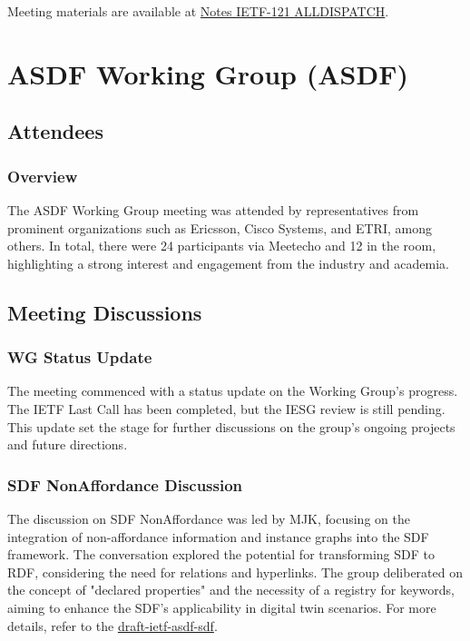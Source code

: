 \documentclass{article}
\begin{document}
Meeting materials are available at \href{https://notes.ietf.org/notes-ietf-121-alldispatch}{Notes IETF-121 ALLDISPATCH}.



\newpage

\section{ASDF Working Group (ASDF)}

\subsection{Attendees}
\subsubsection{Overview}
The ASDF Working Group meeting was attended by representatives from prominent organizations such as Ericsson, Cisco Systems, and ETRI, among others. In total, there were 24 participants via Meetecho and 12 in the room, highlighting a strong interest and engagement from the industry and academia.

\subsection{Meeting Discussions}

\subsubsection{WG Status Update}
The meeting commenced with a status update on the Working Group's progress. The IETF Last Call has been completed, but the IESG review is still pending. This update set the stage for further discussions on the group's ongoing projects and future directions.

\subsubsection{SDF NonAffordance Discussion}
The discussion on SDF NonAffordance was led by MJK, focusing on the integration of non-affordance information and instance graphs into the SDF framework. The conversation explored the potential for transforming SDF to RDF, considering the need for relations and hyperlinks. The group deliberated on the concept of "declared properties" and the necessity of a registry for keywords, aiming to enhance the SDF's applicability in digital twin scenarios. For more details, refer to the \href{https://datatracker.ietf.org/doc/html/draft-ietf-asdf-sdf}{draft-ietf-asdf-sdf}.
\end{document}
